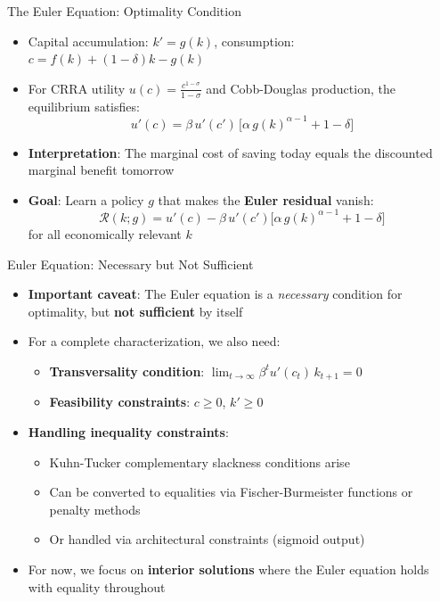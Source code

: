 \documentclass[10pt,english,aspectratio=169]{beamer}
\begin{document}
\begin{frame}{The Euler Equation: Optimality Condition}
\begin{itemize}
  \item Capital accumulation: $k' = g(k)$, \quad consumption: $c = f(k) + (1-\delta)k - g(k)$
  \medskip
  \item For CRRA utility $u(c) = \frac{c^{1-\sigma}}{1-\sigma}$ and Cobb-Douglas production, the equilibrium satisfies:
    \[
      u'(c) = \beta\, u'(c')\, \bigl[\alpha\, g(k)^{\alpha-1} + 1 - \delta\bigr]
      \tag{EE}
    \]
  \medskip
  \item \textbf{Interpretation}: The marginal cost of saving today equals the discounted marginal benefit tomorrow
  \medskip
  \item \textbf{Goal}: Learn a policy $g$ that makes the \textbf{Euler residual} vanish:
    \[
      \mathcal{R}(k; g) = u'(c) - \beta\, u'(c')\bigl[\alpha\, g(k)^{\alpha-1} + 1 - \delta\bigr]
    \]
    for all economically relevant $k$
\end{itemize}
\end{frame}

\begin{frame}{Euler Equation: Necessary but Not Sufficient}
\begin{itemize}
  \item \textbf{Important caveat}: The Euler equation is a \emph{necessary} condition for optimality, but \textbf{not sufficient} by itself
  \medskip
  \item For a complete characterization, we also need:
    \begin{itemize}
      \item \textbf{Transversality condition}: $\lim_{t\to\infty} \beta^t u'(c_t)\, k_{t+1} = 0$
      \item \textbf{Feasibility constraints}: $c \geq 0$, $k' \geq 0$
    \end{itemize}
  \medskip
  \item \textbf{Handling inequality constraints}:
    \begin{itemize}
      \item Kuhn-Tucker complementary slackness conditions arise
      \item Can be converted to equalities via Fischer-Burmeister functions or penalty methods
      \item Or handled via architectural constraints (sigmoid output)
    \end{itemize}
  \medskip
  \item For now, we focus on \textbf{interior solutions} where the Euler equation holds with equality throughout
\end{itemize}
\end{frame}
\end{document}
